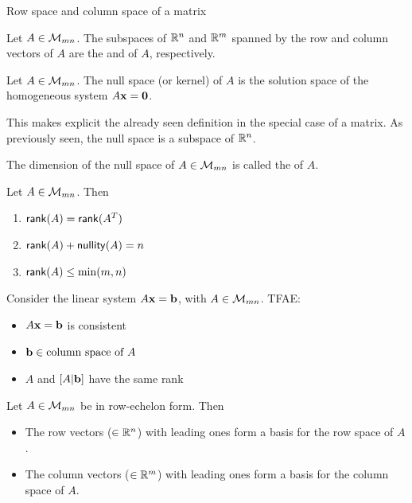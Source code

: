 \documentclass[aspectratio=169]{beamer}
\begin{document}
\begin{frame}{Row space and column space of a matrix}
    \begin{definition}\label{def:row_column_spaces}
        Let $A\in\mathcal{M}_{mn}$. The subspaces of $\mathbb{R}^n$ and $\mathbb{R}^m$ spanned by the row and column vectors of $A$ are the  and  of $A$, respectively.
    \end{definition}
    \begin{definition}
        Let $A\in\mathcal{M}_{mn}$. The null space (or kernel) of $A$ is the solution space of the homogeneous system $A\bx=\b0$.
    \end{definition}
    This makes explicit the already seen definition in the special case of a matrix. As previously seen, the null space is a subspace of $\mathbb{R}^n$.
    \begin{definition}[Nullity]
        The dimension of the null space of $A\in\mathcal{M}_{mn}$ is called the  of $A$.
    \end{definition}
\end{frame}

\begin{frame}
    \begin{theorem}
        Let $A\in\mathcal{M}_{mn}$. Then
        \begin{enumerate}
            \item $\mathsf{rank}(A)=\mathsf{rank}(A^T)$
            \item $\mathsf{rank}(A)+\mathsf{nullity}(A)=n$
            \item $\mathsf{rank}(A)\leq\min(m,n)$
        \end{enumerate}
    \end{theorem}
    \vfill
    \begin{theorem}[Consistency]
        Consider the linear system $A\mathbf{x}=\mathbf{b}$, with $A\in\mathcal{M}_{mn}$. TFAE:
        \begin{itemize}
            \item $A\mathbf{x}=\mathbf{b}$ is consistent
            \item $\mathbf{b}\in\text{column space of }A$
            \item $A$ and $[A|\mathbf{b}]$ have the same rank
        \end{itemize}
    \end{theorem}
\end{frame}

\begin{frame}
    \begin{proposition}
        Let $A\in\mathcal{M}_{mn}$ be in row-echelon form. Then
        \begin{itemize}
            \item The row vectors ($\in\mathbb{R}^n$) with leading ones form a basis for the row space of $A$.
            \item The column vectors ($\in\mathbb{R}^m$) with leading ones form a basis for the column space of $A$.
        \end{itemize}
    \end{proposition}
\end{frame}
\end{document}
